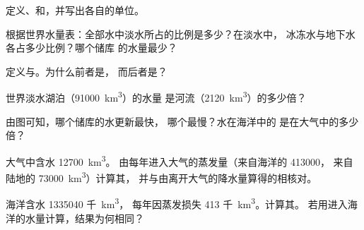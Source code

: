\begin{exercise}[$\star$]\label{exo:g10:freshwater-resources:1}
定义、和，并写出各自的单位。
\end{exercise}

\begin{exercise}[$\star$]\label{exo:g10:freshwater-resources:2}
根据世界水量表：全部水中淡水所占的比例是多少？在淡水中，
冰冻水与地下水各占多少比例？哪个储库
的水量最少？
\end{exercise}

\begin{exercise}[$\star$]\label{exo:g10:freshwater-resources:3}
定义与。为什么前者是，
而后者是？
\end{exercise}

\begin{exercise}[$\star$]\label{exo:g10:freshwater-resources:4}
世界淡水湖泊（\num{91000}~\unit{km^3}）的水量
是河流（\num{2120}~\unit{km^3}）的多少倍？
\end{exercise}

\begin{exercise}[$\star$]\label{exo:g10:freshwater-resources:5}
由图可知，哪个储库的水更新最快，
哪个最慢？水在海洋中的
是在大气中的多少倍？
\end{exercise}

\begin{exercise}[$\star\star$]\label{exo:g10:freshwater-resources:6}
大气中含水 \num{12700}~\unit{km^3}。
由每年进入大气的蒸发量（来自海洋的 \num{413000}，
来自陆地的 \num{73000}~\unit{km^3}）计算其，
并与由离开大气的降水量算得的相核对。
\end{exercise}

\begin{exercise}[$\star\star$]\label{exo:g10:freshwater-resources:7}
海洋含水 \num{1335040} 千~\unit{km^3}，
每年因蒸发损失 \num{413} 千~\unit{km^3}。计算其。
若用进入海洋的水量计算，结果为何相同？
\end{exercise}

